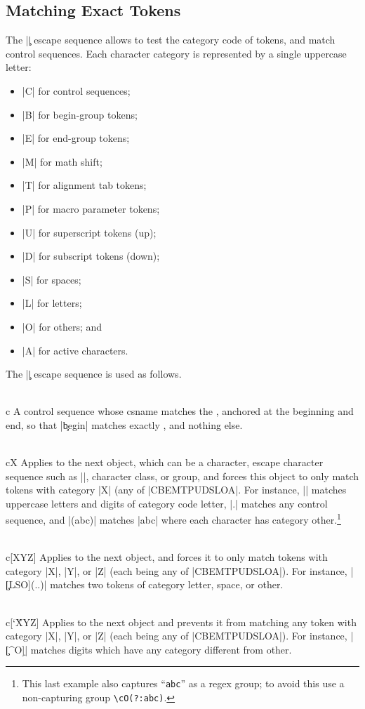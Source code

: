 \documentclass[oneside]{book}
\newenvironment{l3regex-syntax}
  {\begin{itemize}\def\\{\char`\\}\def\makelabel##1{\hss\llap{\ttfamily##1}}}
  {\end{itemize}}
\begin{document}
\subsection{Matching Exact Tokens}

The |\c| escape sequence allows to test the category code of tokens,
and match control sequences. Each character category is represented
by a single uppercase letter:
\begin{itemize}
\item |C| for control sequences;
\item |B| for begin-group tokens;
\item |E| for end-group tokens;
\item |M| for math shift;
\item |T| for alignment tab tokens;
\item |P| for macro parameter tokens;
\item |U| for superscript tokens (up);
\item |D| for subscript tokens (down);
\item |S| for spaces;
\item |L| for letters;
\item |O| for others; and
\item |A| for active characters.
\end{itemize}
The |\c| escape sequence is used as follows.
\begin{l3regex-syntax}
  \item[\\c\Arg{regex}] A control sequence whose csname matches the
    , anchored at the beginning and end, so that |\c{begin}|
    matches exactly , and nothing else.
  \item[\\cX] Applies to the next object, which can be a character,
    escape character sequence such as ||, character class, or
    group, and forces this object to only match tokens with category
    |X| (any of |CBEMTPUDSLOA|. For instance, |\cL[A-Z\d]| matches
    uppercase letters and digits of category code letter, |\cC.|
    matches any control sequence, and |\cO(abc)| matches |abc| where
    each character has category other.\footnote{This last example also
    captures \enquote{\texttt{abc}} as a regex group; to avoid this
    use a non-capturing group \texttt{\textbackslash cO(?:abc)}.}
  \item[{\\c[XYZ]}] Applies to the next object, and forces it to only
    match tokens with category |X|, |Y|, or |Z| (each being any of
    |CBEMTPUDSLOA|). For instance, |\c[LSO](..)| matches two tokens of
    category letter, space, or other.
  \item[{\\c[\char`\^XYZ]}] Applies to the next object and prevents it
    from matching any token with category |X|, |Y|, or |Z| (each being
    any of |CBEMTPUDSLOA|). For instance, |\c[^O]\d| matches digits
    which have any category different from other.
\end{l3regex-syntax}
\end{document}
